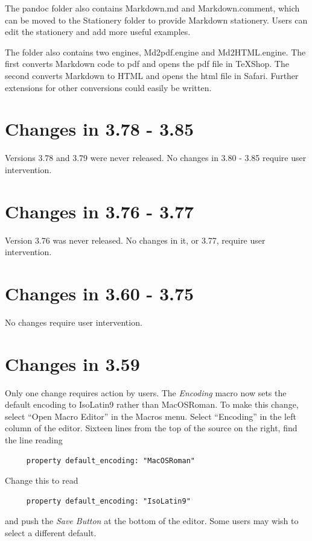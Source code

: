 \documentclass[11pt, oneside]{amsart}
\begin{document}
The pandoc folder also contains Markdown.md and Markdown.comment, which can be moved to the Stationery folder to provide Markdown stationery. Users can edit the stationery and add more useful examples.

The folder also contains two engines, Md2pdf.engine and Md2HTML.engine. The first converts Markdown code to pdf and opens the pdf file in TeXShop. The second converts Markdown to HTML and opens the html file in Safari.
Further extensions for other conversions could easily be written.

\section{Changes in 3.78 - 3.85}

Versions 3.78 and 3.79 were never released. No changes in 3.80 - 3.85 require user intervention.



\section{Changes in 3.76 - 3.77}

Version 3.76 was never released. No changes in it, or 3.77, require user intervention.


\section{Changes in 3.60 - 3.75}

No changes require user intervention.

\section{Changes in 3.59}

Only one change requires  action by users. The {\em Encoding} macro now sets the default encoding to IsoLatin9 rather than MacOSRoman. To make this change, 
select ``Open Macro Editor'' in the Macros menu. Select ``Encoding'' in the left column of the editor. Sixteen lines from the top of the source on the right, find the line reading
\begin{verbatim}
     property default_encoding: "MacOSRoman"
\end{verbatim}
Change this to read
\begin{verbatim}
     property default_encoding: "IsoLatin9"
\end{verbatim}
and push the {\em Save Button} at the bottom of the editor. Some users may wish to select a different default.
\end{document}
